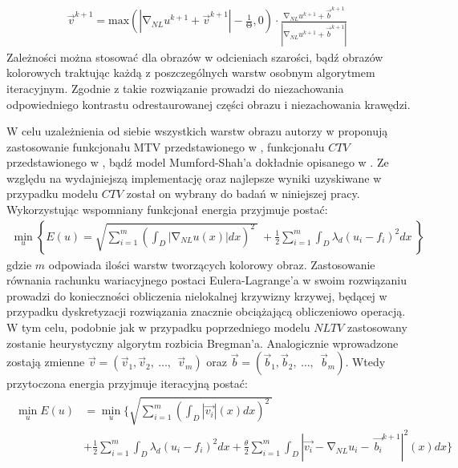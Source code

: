 \documentclass[12pt, twoside, openany]{report}
\theoremstyle{definition}
\begin{document}
\begin{align}
{\overrightarrow{v}}^{k+1}\mathrm{=}{\mathrm{max} \left(\left|{\mathrm{\nabla }}_{NL}u^{k+1}+{\overrightarrow{v}}^{k+1}\right|-\frac{1}{\mathrm{\Theta }},0\right)\cdot\frac{{\mathrm{\nabla }}_{NL}u^{k+1}+{\overrightarrow{b}}^{k+1}}{\left|{\mathrm{\nabla }}_{NL}u^{k+1}+{\overrightarrow{b}}^{k+1}\right|}\ }
\label{ELNLTV2}
\end{align}
Zależności można stosować dla obrazów w odcieniach szarości, bądź obrazów kolorowych traktując każdą z poszczególnych warstw osobnym algorytmem iteracyjnym. Zgodnie z \cite{duan2015fast} takie rozwiązanie prowadzi do niezachowania odpowiedniego kontrastu odrestaurowanej części obrazu i niezachowania krawędzi.
\par
W celu uzależnienia od siebie wszystkich warstw obrazu autorzy w \cite{duan2015fast} proponują zastosowanie funkcjonału MTV przedstawionego w \cite{yang2009fast}, funkcjonału $CTV$ przedstawionego w \cite{blomgren1998color}, bądź model Mumford-Shah’a dokładnie opisanego w \cite{jung2011nonlocal}. Ze względu na wydajniejszą implementację oraz najlepsze wyniki uzyskiwane w przypadku modelu $CTV$ został on wybrany do badań w niniejszej pracy. Wykorzystując wspomniany funkcjonał energia przyjmuje postać:
\begin{align}
{\mathop{\mathrm{min}}_{u} \left\{E\left(u\right)=\sqrt{\sum^m_{i=1}{{\left(\int_D{\left|{\mathrm{\nabla }}_{NL}u(x)\right|}dx\right)}^2}\ }\ +\frac{1}{2}\sum^m_{i=1}{\int_D{{\lambda }_d{\left(u_i-f_i\right)}^2}dx}\ \right\}\ }
\label{ENLCTV}
\end{align}
gdzie $m$ odpowiada ilości warstw tworzących kolorowy obraz. Zastosowanie równania rachunku wariacyjnego postaci Eulera-Lagrange’a w swoim rozwiązaniu prowadzi do konieczności obliczenia nielokalnej krzywizny krzywej, będącej w przypadku dyskretyzacji rozwiązania znacznie obciążającą obliczeniowo operacją. W tym celu, podobnie jak w przypadku poprzedniego modelu $NLTV$ zastosowany zostanie heurystyczny algorytm rozbicia Bregman’a. Analogicznie wprowadzone zostają zmienne $\overrightarrow{v}=\left({\overrightarrow{v}}_1,{\overrightarrow{v}}_2,\ \dots ,\ \ {\overrightarrow{v}}_m\right)$ oraz $\overrightarrow{b}=\left({\overrightarrow{b}}_1,{\overrightarrow{b}}_2,\ \dots ,\ \ {\overrightarrow{b}}_m\right)$. Wtedy przytoczona energia przyjmuje iteracyjną postać: 
\begin{align}
\begin{aligned}
\mathop{\mathrm{min}}_{u}E\left(u\right) &= \mathop{\mathrm{min}}_{u}\Biggl\{\sqrt{\sum^m_{i=1}{{\left(\int_D{\left|\overrightarrow{v_i}\right|(x)}dx\right)}^2}\ }\\ 
&+\frac{1}{2}\sum^m_{i=1}{\int_D{{\lambda }_d{\left(u_i-f_i\right)}^2}dx} 
+\frac{\theta }{2}\sum^m_{i=1}{\int_D{{\left|\overrightarrow{v_i}-{\mathrm{\nabla }}_{NL}u_i-\ {\overrightarrow{b_i}}^{k+1}\right|}^2\left(x\right)}dx}\Biggr\}
\end{aligned}
\label{ENLCTV1}
\end{align}
\end{document}
